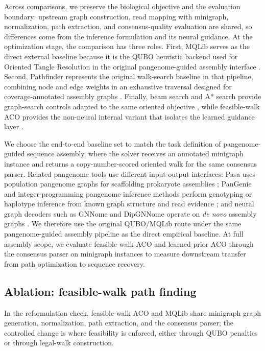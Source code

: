 \documentclass[11pt]{article}
\begin{document}
Across comparisons, we preserve the biological objective and the evaluation boundary: upstream graph construction, read mapping with minigraph, normalization, path extraction, and consensus-quality evaluation are shared, so differences come from the inference formulation and its neural guidance. At the optimization stage, the comparison has three roles. First, MQLib serves as the direct external baseline because it is the QUBO heuristic backend used for Oriented Tangle Resolution in the original pangenome-guided assembly interface \citep{cudby2026pangenome,dunning2018mqlib}. Second, Pathfinder represents the original walk-search baseline in that pipeline, combining node and edge weights in an exhaustive traversal designed for coverage-annotated assembly graphs \citep{zhou2025oatk,cudby2026pangenome}. Finally, beam search and A* search provide graph-search controls adapted to the same oriented objective \citep{lowerre1976harpy,hart1968astar}, while feasible-walk ACO provides the non-neural internal variant that isolates the learned guidance layer \citep{dorigo1997acs,dorigo2004aco}.

We choose the end-to-end baseline set to match the task definition of pangenome-guided sequence assembly, where the solver receives an annotated minigraph instance and returns a copy-number-scored oriented walk for the same consensus parser. Related pangenome tools use different input-output interfaces: Pasa uses population pangenome graphs for scaffolding prokaryote assemblies \citep{do2024pasa}; PanGenie and integer-programming pangenome inference methods perform genotyping or haplotype inference from known graph structure and read evidence \citep{ebler2022pangenie,chandra2024phi}; and neural graph decoders such as GNNome and DipGNNome operate on \emph{de novo} assembly graphs \citep{vrcek2025gnnome,schmitz2025dipgnnome}. We therefore use the original QUBO/MQLib route under the same pangenome-guided assembly pipeline as the direct empirical baseline. At full assembly scope, we evaluate feasible-walk ACO and learned-prior ACO through the consensus parser on minigraph instances to measure downstream transfer from path optimization to sequence recovery.

\subsection{Ablation: feasible-walk path finding}

In the reformulation check, feasible-walk ACO and MQLib share minigraph graph generation, normalization, path extraction, and the consensus parser; the controlled change is where feasibility is enforced, either through QUBO penalties or through legal-walk construction.
\end{document}
